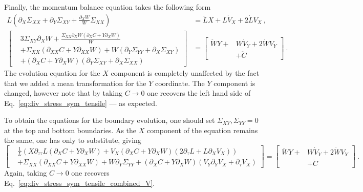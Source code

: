 \documentclass[12pt,a4paper]{article}
\begin{document}
Finally, the momentum balance equation takes the following form
\begin{equation}\label{eq:div_stress_asym_tensile_dynamics_V}
  \begin{split}
     L\left(\partial_X\Sigma_{XX} + \partial_Y\Sigma_{XY} + \frac{\partial_X W}{W} \Sigma_{XX}\right) & = \ddot{L} X + L \dot{V}_X + 2 \dot{L} V_X \ , \\
      \left[\begin{split}& 3 \Sigma_{XY}\partial_XW + \frac{\Sigma_{XX}\partial_X W \left(\partial_X C + Y \partial_X W\right)}{W}  \\
      & + \Sigma_{XX}\left(\partial_{XX}C + Y\partial_{XX}W\right) + W\left(\partial_Y \Sigma_{YY} + \partial_X \Sigma_{XY}\right) \\
       &+ \left(\partial_X C + Y \partial_X W\right)\left(\partial_Y\Sigma_{XY} + \partial_X \Sigma_{XX}\right)\end{split}\right] & = \left[\begin{split}\ddot{W} Y +& W \dot{V}_Y + 2 \dot{W} V_Y \\
        & + \ddot{C}\end{split}\right] \ .
  \end{split}
\end{equation}
The evolution equation for the $X$ component is completely unaffected by the fact that we added a mean transformation for the $Y$ coordinate. The $Y$ component is changed, however note that by taking $C\rightarrow0$ one recovers the left hand side of Eq.~\eqref{eq:div_stress_sym_tensile} --- as expected.

To obtain the equations for the boundary evolution, one should set $\Sigma_{XY},\Sigma_{YY}=0$ at the top and bottom boundaries. As the $X$ component of the equation remains the same, one has only to substitute, giving
\begin{equation}\label{eq:div_stress_asym_tensile_combined_V}
\left[\begin{split}
         &\frac{1}{L}\left(X \partial_{\tau\tau} L \left(\partial_X C + Y \partial_X W\right) + V_X \left(\partial_X C + Y \partial_X W \right) \left(2\partial_{\tau}L + L \partial_X V_X \right) \right) \\
         &+ \Sigma_{XX}\left(\partial_{XX} C + Y \partial_{XX} W \right) + W \partial_Y\Sigma_{YY} +
         \left(\partial_X C + Y \partial_X W\right) \left(V_Y \partial_Y V_X + \partial_{\tau} V_X\right)
      \end{split}\right] = \left[\begin{split}\ddot{W} Y +& W \dot{V}_Y + 2 \dot{W} V_Y \\
        & + \ddot{C}\end{split}\right]\ .
\end{equation}
Again, taking $C\rightarrow0$ one recovers Eq.~\eqref{eq:div_stress_sym_tensile_combined_V}. 
\end{document}

